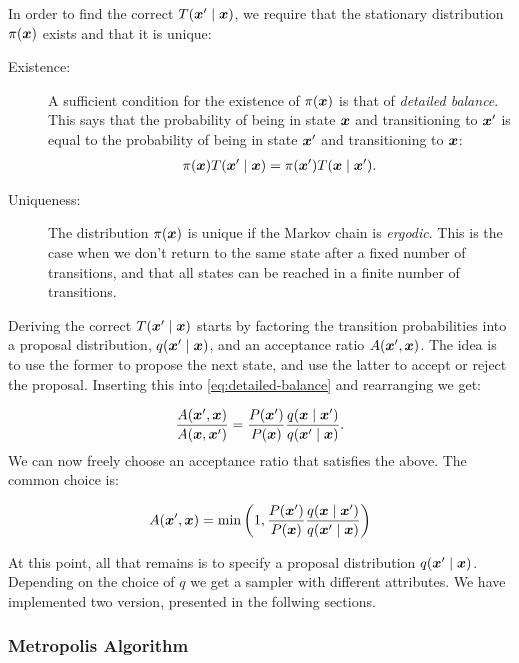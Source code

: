 \documentclass[Thesis.tex]{subfiles}
\begin{document}
In order to find the correct $T\qty(\bm{x}'\;\middle|\;\bm{x})$, we require that the stationary
distribution $\pi(\bm{x})$ exists and that it is unique:

\begin{description}
\item[Existence:] A sufficient condition for the existence of $\pi(\bm{x})$ is that
  of \emph{detailed balance}. This says that the probability of being in state
  $\bm{x}$ and transitioning to $\bm{x}'$ is equal to the probability of being in state
  $\bm{x}'$ and transitioning to $\bm{x}$:
  \begin{align}
    \label{eq:detailed-balance}
    \pi\qty(\bm{x})T\qty(\bm{x}'\;\middle|\;\bm{x}) = \pi\qty(\bm{x}')T\qty(\bm{x}\;\middle|\;\bm{x}').
  \end{align}
\item[Uniqueness:] The distribution $\pi(\bm{x})$ is unique if the Markov chain is
  \emph{ergodic}. This is the case when we don't return to the same state after
  a fixed number of transitions, and that all states can be reached in a finite
  number of transitions.
\end{description}
Deriving the correct $T\qty(\bm{x}'\;\middle|\;\bm{x})$ starts by factoring the transition
probabilities into a proposal distribution, $q\qty(\bm{x}'\;\middle|\;\bm{x})$, and an
acceptance ratio $A\qty(\bm{x}',\bm{x})$. The idea is to use the former to propose the
next state, and use the latter to accept or reject the proposal. Inserting this
into \cref{eq:detailed-balance} and rearranging we get:

\begin{align}
  \frac{A\qty(\bm{x}',\bm{x})}{A\qty(\bm{x},\bm{x}')} = \frac{P\qty(\bm{x}')}{P\qty(\bm{x})}\frac{q\qty(\bm{x}\;\middle|\;\bm{x}')}{q\qty(\bm{x}'\;\middle|\;\bm{x})}.
\end{align}
We can now freely choose an acceptance ratio that satisfies the above. The
common choice is:

\begin{align}
  A\qty(\bm{x}',\bm{x}) = \min\qty(1, \frac{P\qty(\bm{x}')}{P\qty(\bm{x})}\frac{q\qty(\bm{x}\;\middle|\;\bm{x}')}{q\qty(\bm{x}'\;\middle|\;\bm{x})})
\end{align}

At this point, all that remains is to specify a proposal distribution
$q\qty(\bm{x}'\;\middle|\;\bm{x})$. Depending on the choice of $q$ we get a sampler with
different attributes. We have implemented two version, presented in the follwing
sections.

\subsubsection{Metropolis Algorithm}
\end{document}
